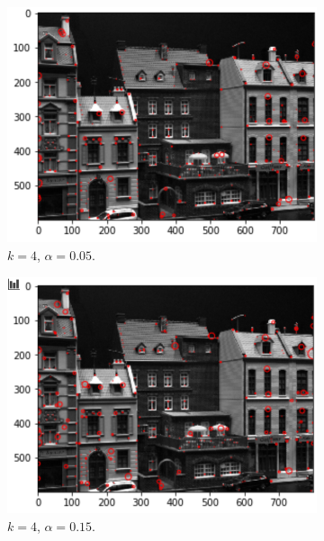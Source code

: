 \begin{figure}[H]
\begin{subfigure}[b]{0.42\linewidth}
		\includegraphics[width=\linewidth]{Materials/E3/k4a005}
		\caption{$k = 4$, $\alpha = 0.05$.}
	\end{subfigure}
	\hfill
	\begin{subfigure}[b]{0.42\linewidth}
		\centering
		\includegraphics[width=\linewidth]{Materials/E3/k4a015}
		\caption{$k = 4$, $\alpha = 0.15$.}
	\end{subfigure}
	\\
	\begin{subfigure}[b]{0.4\linewidth}
		\centering

\end{subfigure}
\end{figure}

